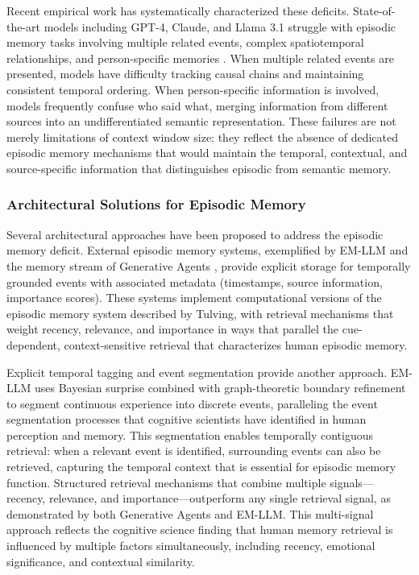 Recent empirical work has systematically characterized these deficits. State-of-the-art models including GPT-4, Claude, and Llama 3.1 struggle with episodic memory tasks involving multiple related events, complex spatiotemporal relationships, and person-specific memories \citep{ning2025episodic}. When multiple related events are presented, models have difficulty tracking causal chains and maintaining consistent temporal ordering. When person-specific information is involved, models frequently confuse who said what, merging information from different sources into an undifferentiated semantic representation. These failures are not merely limitations of context window size: they reflect the absence of dedicated episodic memory mechanisms that would maintain the temporal, contextual, and source-specific information that distinguishes episodic from semantic memory.

\subsubsection{Architectural Solutions for Episodic Memory}

Several architectural approaches have been proposed to address the episodic memory deficit. External episodic memory systems, exemplified by EM-LLM \citep{hu2025emllm} and the memory stream of Generative Agents \citep{park2023generative}, provide explicit storage for temporally grounded events with associated metadata (timestamps, source information, importance scores). These systems implement computational versions of the episodic memory system described by Tulving, with retrieval mechanisms that weight recency, relevance, and importance in ways that parallel the cue-dependent, context-sensitive retrieval that characterizes human episodic memory.

Explicit temporal tagging and event segmentation provide another approach. EM-LLM \citep{hu2025emllm} uses Bayesian surprise combined with graph-theoretic boundary refinement to segment continuous experience into discrete events, paralleling the event segmentation processes that cognitive scientists have identified in human perception and memory. This segmentation enables temporally contiguous retrieval: when a relevant event is identified, surrounding events can also be retrieved, capturing the temporal context that is essential for episodic memory function. Structured retrieval mechanisms that combine multiple signals---recency, relevance, and importance---outperform any single retrieval signal, as demonstrated by both Generative Agents and EM-LLM. This multi-signal approach reflects the cognitive science finding that human memory retrieval is influenced by multiple factors simultaneously, including recency, emotional significance, and contextual similarity.


